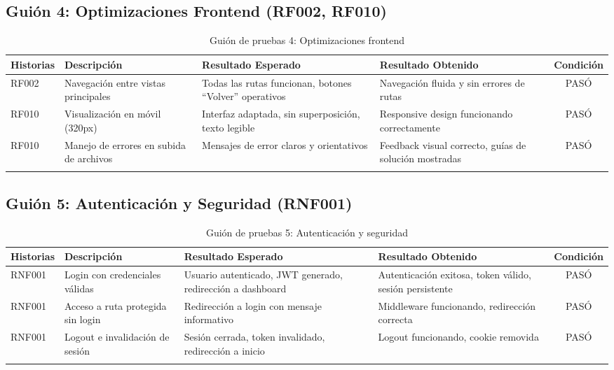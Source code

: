\subsection{Guión 4: Optimizaciones Frontend (RF002, RF010)}

\begin{longtable}{ | p{2cm} | p{4cm} | p{4cm} | p{4cm} | c |}
\hline
\textbf{Historias} & \textbf{Descripción} & \textbf{Resultado Esperado} & \textbf{Resultado Obtenido} & \textbf{Condición}\\
\hline
RF002 & Navegación entre vistas principales & Todas las rutas funcionan, botones ``Volver'' operativos & Navegación fluida y sin errores de rutas & \color{ForestGreen}PASÓ \\
\hline
RF010 & Visualización en móvil (320px) & Interfaz adaptada, sin superposición, texto legible & Responsive design funcionando correctamente & \color{ForestGreen}PASÓ \\
\hline
RF010 & Manejo de errores en subida de archivos & Mensajes de error claros y orientativos & Feedback visual correcto, guías de solución mostradas & \color{ForestGreen}PASÓ \\
\hline
\caption{Guión de pruebas 4: Optimizaciones frontend}
\label{TestScript4}
\end{longtable}

\subsection{Guión 5: Autenticación y Seguridad (RNF001)}

\begin{longtable}{ | p{2cm} | p{4cm} | p{4cm} | p{4cm} | c |}
\hline
\textbf{Historias} & \textbf{Descripción} & \textbf{Resultado Esperado} & \textbf{Resultado Obtenido} & \textbf{Condición}\\
\hline
RNF001 & Login con credenciales válidas & Usuario autenticado, JWT generado, redirección a dashboard & Autenticación exitosa, token válido, sesión persistente & \color{ForestGreen}PASÓ \\
\hline
RNF001 & Acceso a ruta protegida sin login & Redirección a login con mensaje informativo & Middleware funcionando, redirección correcta & \color{ForestGreen}PASÓ \\
\hline
RNF001 & Logout e invalidación de sesión & Sesión cerrada, token invalidado, redirección a inicio & Logout funcionando, cookie removida & \color{ForestGreen}PASÓ \\
\hline
\caption{Guión de pruebas 5: Autenticación y seguridad}
\label{TestScript5}
\end{longtable}
